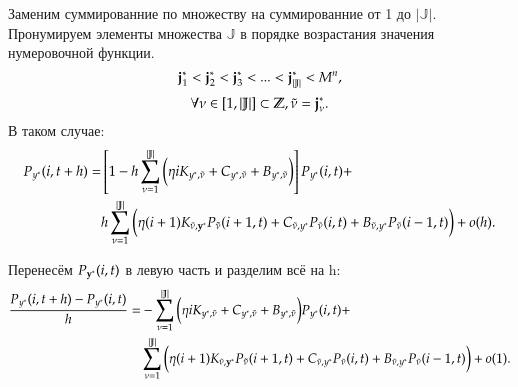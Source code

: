 Заменим суммированние по множеству на суммированние от 1 до \(|\mathbb{J}|\).
Пронумируем элементы множества \(\mathbb{J}\) в порядке возрастания значения нумеровочной функции.
\[\bold{j}^*_1 < \bold{j}^*_2 < \bold{j}^*_3 <... < \bold{j}^*_{|\mathbb{J}|} < M^n,\]
\[\forall \nu \in [1, |\mathbb{J}|] \subset \mathbb{Z}, \tilde{\nu} = \bold{j}^*_{\nu}.\]
В таком случае:
\begin{align*} 
    P_{y^*}(i, t+h) =
    & \left[1 - h \sum^{|\mathbb{J}|}_{\nu=1}
	\bigg(\eta i K_{y^*, \tilde{\nu}}
	+ C_{y^*, \tilde{\nu}} 
	+ B_{{y^*}, \tilde{\nu}}\bigg)
	\right]P_{y^*}(i, t)+\\ 
    &h\sum^{|\mathbb{J}|}_{\nu=1} 
	\bigg(\eta (i+1) K_{\tilde{\nu}, \bold{y}^*}P_{\bold{\tilde{\nu}}}(i+1, t)
	+ C_{\tilde{\nu}, y^*}P_{\tilde{\nu}}(i, t) 
	+ B_{\tilde{\nu}, y^*}P_{\tilde{\nu}}(i-1, t) \bigg)+o(h).
\end{align*} 

Перенесём \(P_{\bold{y}^*}(i, t)\) в левую часть и разделим всё на h:
\begin{align*} 
    \frac{P_{y^*}(i, t+h) - P_{y^*}(i, t)}{h} =
    &- \sum^{|\mathbb{J}|}_{\nu=1}
        \bigg(\eta i K_{y^*, \tilde{\nu}}
        + C_{y^*, \tilde{\nu}} 
        + B_{{y^*}, \tilde{\nu}}\bigg)
        P_{y^*}(i, t)+\\
    &\sum^{|\mathbb{J}|}_{\nu=1} 
        \bigg(\eta (i+1) K_{\tilde{\nu}, \bold{y}^*}P_{\bold{\tilde{\nu}}}(i+1, t)
        + C_{\tilde{\nu}, y^*}P_{\tilde{\nu}}(i, t) 
        + B_{\tilde{\nu}, y^*}P_{\tilde{\nu}}(i-1, t) \bigg)+o(1).
\end{align*} 
